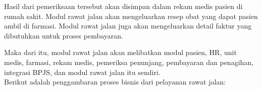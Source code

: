 Hasil dari pemeriksaan tersebut akan disimpan dalam rekam medis pasien di rumah sakit. Modul rawat jalan akan mengeluarkan resep obat yang dapat pasien ambil di farmasi. Modul rawat jalan juga akan mengeluarkan detail faktur yang dibutuhkan untuk proses pembayaran. 

Maka dari itu, modul rawat jalan akan melibatkan modul pasien, HR, unit medis, farmasi, rekam medis, pemeriksa penunjang, pembayaran dan penagihan, integrasi BPJS, dan modul rawat jalan itu sendiri.\\
Berikut adalah penggambaran proses bisnis dari pelayanan rawat jalan:

\begin{adjustbox}{width=1\textwidth}
	\begin{minipage}{\linewidth}
	\end{minipage}
\end{adjustbox}

